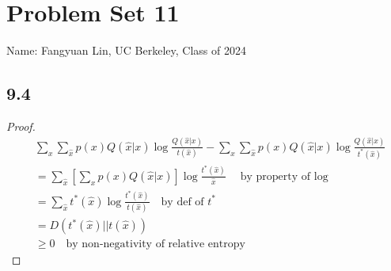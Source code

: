 \documentclass[../main.tex]{subfiles}
\begin{document}
\section*{Problem Set 11}
    Name: Fangyuan Lin, UC Berkeley, Class of 2024
\subsection*{9.4}
\begin{proof}
    \begin{align*}
        &\sum_x\sum_{\hat x} p(x)Q(\hat x|x)\log \frac{Q(\hat x|x)}{t(\hat x)} - \sum_x\sum_{\hat x}p(x)Q(\hat x|x)\log \frac{Q(\hat x|x)}{t^*(\hat x)}\\
        &= \sum_{\hat x}[\sum_xp(x)Q(\hat x|x)]\log \frac{t^*(\hat x)}{\hat x} \quad \text{by property of $\log$}\\
        &= \sum_{\hat x}t^*(\hat x)\log \frac{t^*(\hat x)}{t(\hat x)}\quad\text{by def of $t^*$}\\
        &=D(t^*(\hat x)||t(\hat x))\\
        &\geq 0 \quad \text{by non-negativity of relative entropy}
    \end{align*}
\end{proof}
\end{document}
